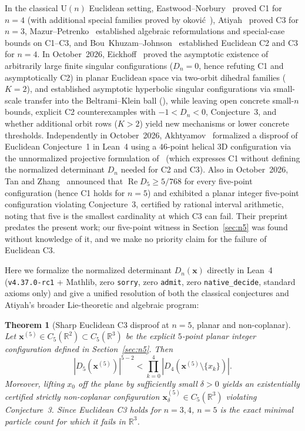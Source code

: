 \documentclass[11pt,reqno]{amsart}
\newtheorem{theorem}{Theorem}[section]
\theoremstyle{remark}
\newcommand{\R}{\mathbb{R}}
\begin{document}
In the classical $\mathrm{U}(n)$ Euclidean setting, Eastwood--Norbury~\cite{EastwoodNorbury2001} proved C1 for $n = 4$ (with additional special families proved by \DJ okovi\'c~\cite{Djokovic2002}), Atiyah~\cite{Atiyah2001} proved C3 for $n = 3$, Mazur--Petrenko~\cite{MazurPetrenko2011} established algebraic reformulations and special-case bounds on C1--C3, and Bou~Khuzam--Johnson~\cite{BouKhuzamJohnson2014} established Euclidean C2 and C3 for $n = 4$.
In October~2026, Eickhoff~\cite{Eickhoff2026} proved the asymptotic existence of arbitrarily large finite singular configurations ($D_n = 0$, hence refuting C1 and asymptotically C2) in planar Euclidean space via two-orbit dihedral families ($K = 2$), and established asymptotic hyperbolic singular configurations via small-scale transfer into the Beltrami--Klein ball (\cite[\S7]{Eickhoff2026}), while leaving open concrete small-$n$ bounds, explicit C2 counterexamples with $-1 < D_n < 0$, Conjecture~3, and whether additional orbit rows ($K > 2$) yield new mechanisms or lower concrete thresholds.
Independently in October~2026, Akhtyamov~\cite{Akhtyamov2026} formalized a disproof of Euclidean Conjecture~1 in Lean~4 using a $46$-point helical 3D configuration via the unnormalized projective formulation of~\cite{MazurPetrenko2011} (which expresses C1 without defining the normalized determinant $D_n$ needed for C2 and C3).
Also in October~2026, Tan and Zhang~\cite{TanZhang2026} announced that $\operatorname{Re} D_5 \ge 5/768$ for every five-point configuration (hence C1 holds for $n = 5$) and exhibited a planar integer five-point configuration violating Conjecture~3, certified by rational interval arithmetic, noting that five is the smallest cardinality at which C3 can fail.
Their preprint predates the present work; our five-point witness in Section~\ref{sec:n5} was found without knowledge of it, and we make no priority claim for the failure of Euclidean C3.

Here we formalize the normalized determinant $D_n(\mathbf{x})$ directly in Lean~4 (\texttt{v4.37.0-rc1} + Mathlib, zero \texttt{sorry}, zero \texttt{admit}, zero \texttt{native\_decide}, standard axioms only) and give a unified resolution of both the classical conjectures and Atiyah's broader Lie-theoretic and algebraic program:

\begin{theorem}[Sharp Euclidean C3 disproof at $n = 5$, planar and non-coplanar]\label{thm:main-c3}
Let $\mathbf{x}^{(5)} \in C_5(\R^2) \subset C_5(\R^3)$ be the explicit $5$-point planar integer configuration defined in Section~\ref{sec:n5}.
Then
\[
  |D_5(\mathbf{x}^{(5)})|^{5-2} < \prod_{k=0}^{4} |D_4(\mathbf{x}^{(5)} \setminus \{x_k\})|.
\]
Moreover, lifting $x_0$ off the plane by sufficiently small $\delta > 0$ yields an existentially certified strictly non-coplanar configuration $\mathbf{x}^{(5)}_\delta \in C_5(\R^3)$ violating Conjecture~3.
Since Euclidean C3 holds for $n = 3, 4$, $n = 5$ is the exact minimal particle count for which it fails in $\R^3$.
\end{theorem}
\end{document}
